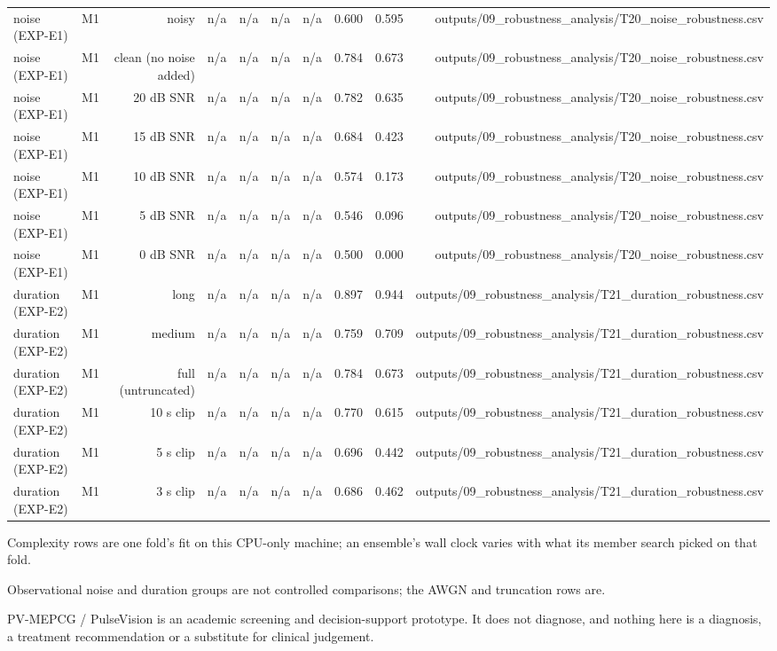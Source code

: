 \begin{table}[htbp]
\begin{tabular}{lrrrrrrrrr}
    noise (EXP-E1) & M1 & noisy & n/a & n/a & n/a & n/a & 0.600 & 0.595 & outputs/09\_robustness\_analysis/T20\_noise\_robustness.csv \\
    noise (EXP-E1) & M1 & clean (no noise added) & n/a & n/a & n/a & n/a & 0.784 & 0.673 & outputs/09\_robustness\_analysis/T20\_noise\_robustness.csv \\
    noise (EXP-E1) & M1 & 20 dB SNR & n/a & n/a & n/a & n/a & 0.782 & 0.635 & outputs/09\_robustness\_analysis/T20\_noise\_robustness.csv \\
    noise (EXP-E1) & M1 & 15 dB SNR & n/a & n/a & n/a & n/a & 0.684 & 0.423 & outputs/09\_robustness\_analysis/T20\_noise\_robustness.csv \\
    noise (EXP-E1) & M1 & 10 dB SNR & n/a & n/a & n/a & n/a & 0.574 & 0.173 & outputs/09\_robustness\_analysis/T20\_noise\_robustness.csv \\
    noise (EXP-E1) & M1 & 5 dB SNR & n/a & n/a & n/a & n/a & 0.546 & 0.096 & outputs/09\_robustness\_analysis/T20\_noise\_robustness.csv \\
    noise (EXP-E1) & M1 & 0 dB SNR & n/a & n/a & n/a & n/a & 0.500 & 0.000 & outputs/09\_robustness\_analysis/T20\_noise\_robustness.csv \\
    duration (EXP-E2) & M1 & long & n/a & n/a & n/a & n/a & 0.897 & 0.944 & outputs/09\_robustness\_analysis/T21\_duration\_robustness.csv \\
    duration (EXP-E2) & M1 & medium & n/a & n/a & n/a & n/a & 0.759 & 0.709 & outputs/09\_robustness\_analysis/T21\_duration\_robustness.csv \\
    duration (EXP-E2) & M1 & full (untruncated) & n/a & n/a & n/a & n/a & 0.784 & 0.673 & outputs/09\_robustness\_analysis/T21\_duration\_robustness.csv \\
    duration (EXP-E2) & M1 & 10 s clip & n/a & n/a & n/a & n/a & 0.770 & 0.615 & outputs/09\_robustness\_analysis/T21\_duration\_robustness.csv \\
    duration (EXP-E2) & M1 & 5 s clip & n/a & n/a & n/a & n/a & 0.696 & 0.442 & outputs/09\_robustness\_analysis/T21\_duration\_robustness.csv \\
    duration (EXP-E2) & M1 & 3 s clip & n/a & n/a & n/a & n/a & 0.686 & 0.462 & outputs/09\_robustness\_analysis/T21\_duration\_robustness.csv \\
    \bottomrule
  \end{tabular}
  \par\footnotesize Complexity rows are one fold's fit on this CPU-only machine; an ensemble's wall clock varies with what its member search picked on that fold.
  \par\footnotesize Observational noise and duration groups are not controlled comparisons; the AWGN and truncation rows are.
  \par\footnotesize PV-MEPCG / PulseVision is an academic screening and decision-support prototype. It does not diagnose, and nothing here is a diagnosis, a treatment recommendation or a substitute for clinical judgement.
\end{table}
